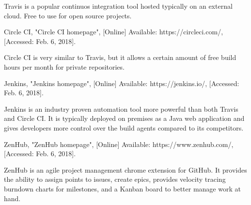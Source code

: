\documentclass[11pt,fleqn,twoside]{article}
\begin{document}
\begin{thebibliography}{1}
  Travis is a popular continuos integration tool hosted typically on an external cloud. Free to use for open source
  projects.

 Circle CI, "Circle CI  homepage", [Online] Available: https://circleci.com/, [Accessed: Feb. 6, 2018].

  Circle CI is very similar to Travis, but it allows a certain amount of free build hours per month for private
  repositories.

 Jenkins, "Jenkins homepage", [Online] Available: https://jenkins.io/, [Accessed: Feb. 6, 2018].

  Jenkins is an industry proven automation tool more powerful than both Travis and Circle CI. It is typically deployed
  on premises as a Java web application and gives developers more control over the build agents compared to its
  competitors.

 ZenHub, "ZenHub homepage", [Online] Available: https://www.zenhub.com/, [Accessed: Feb. 6, 2018].

    ZenHub is an agile project management chrome extension for GitHub. It provides the ability to assign points
    to issues, create epics, provides velocity tracing burndown charts for milestones, and a Kanban board to
    better manage work at hand.

\end{thebibliography}

% 
%
\end{document}
